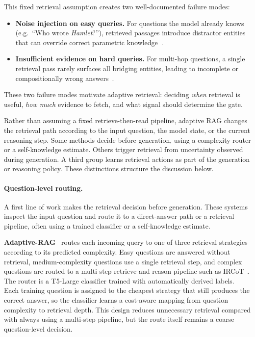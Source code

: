 This fixed retrieval assumption creates two well-documented failure modes:

\begin{itemize}
    \item \textbf{Noise injection on easy queries.} For questions the model already knows (e.g.\ ``Who wrote \emph{Hamlet}?''), retrieved passages introduce distractor entities that can override correct parametric knowledge~\cite{popqa,ren2023}.
    \item \textbf{Insufficient evidence on hard queries.} For multi-hop questions, a single retrieval pass rarely surfaces all bridging entities, leading to incomplete or compositionally wrong answers~\cite{ircot}.
\end{itemize}

These two failure modes motivate adaptive retrieval: deciding \emph{when} retrieval is \mbox{useful}, \emph{how much} evidence to fetch, and what signal should determine the gate.

Rather than assuming a fixed retrieve-then-read pipeline, adaptive RAG changes the retrieval path according to the input question, the model state, or the current \mbox{reasoning} step. Some methods decide before generation, using a complexity router or a self-knowledge estimate. Others trigger retrieval from uncertainty observed during generation. A third group learns retrieval actions as part of the generation or reasoning policy. These distinctions structure the discussion below.

\paragraph{Question-level routing.}

A first line of work makes the retrieval decision before generation. These systems inspect the input question and route it to a direct-answer path or a retrieval pipeline, often using a trained classifier or a self-knowledge estimate.

\textbf{Adaptive-RAG}~\cite{adaptiverag} routes each incoming query to one of three retrieval strategies according to its predicted complexity. Easy questions are answered without retrieval, medium-complexity questions use a single retrieval step, and complex questions are routed to a multi-step retrieve-and-reason pipeline such as IRCoT~\cite{ircot}. The router is a T5-Large classifier trained with automatically derived labels. Each training question is assigned to the cheapest strategy that still produces the correct answer, so the classifier learns a cost-aware mapping from question complexity to retrieval depth. This design reduces unnecessary retrieval compared with always using a multi-step pipeline, but the route itself remains a coarse question-level decision.

